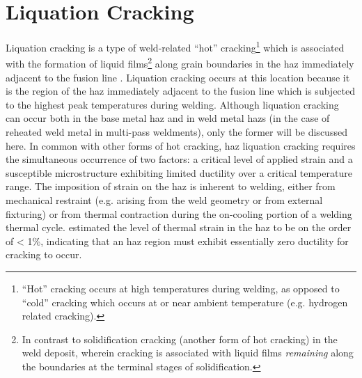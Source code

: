 \section{Liquation Cracking} \label{sec:liquation-cracking}
Liquation cracking is a type of weld-related “hot” cracking\footnote{“Hot” cracking occurs at high temperatures during welding, as opposed to “cold” cracking which occurs at or near ambient temperature (e.g. hydrogen related cracking).} which is associated with the formation of liquid films\footnote{In contrast to solidification cracking (another form of hot cracking) in the weld deposit, wherein cracking is associated with liquid films \emph{remaining} along the boundaries at the terminal stages of solidification.} along grain boundaries in the \gls{haz} immediately adjacent to the fusion line \cite{lippold_welding_2014}. Liquation cracking occurs at this location because it is the region of the \gls{haz} immediately adjacent to the fusion line which is subjected to the highest peak temperatures during welding. Although liquation cracking can occur both in the base metal \gls{haz} and in weld metal \gls{haz}s (in the case of reheated weld metal in multi-pass weldments), only the former will be discussed here. In common with other forms of hot cracking, \gls{haz} liquation cracking requires the simultaneous occurrence of two factors: a critical level of applied strain and a susceptible microstructure exhibiting limited ductility over a critical temperature range. The imposition of strain on the \gls{haz} is inherent to welding, either from mechanical restraint (e.g. arising from the weld geometry or from external fixturing) or from thermal contraction during the on-cooling portion of a welding thermal cycle. \citet{yeniscavich_correlation_1970} estimated the level of thermal strain in the \gls{haz} to be on the order of < 1\%, indicating that an \gls{haz} region must exhibit essentially zero ductility for cracking to occur. 


